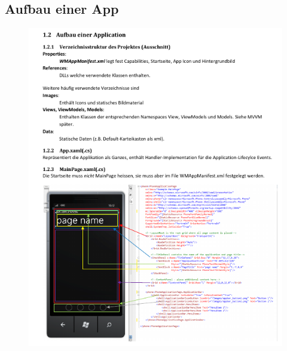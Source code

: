 \documentclass[a4paper,10pt]{scrreprt}
\begin{document}
\newpage
\subsection{Aufbau einer App}
\begin{figure}[h!]
 \centering
 \includegraphics{./aufbau.png}
\end{figure}
\newpage
\end{document}
